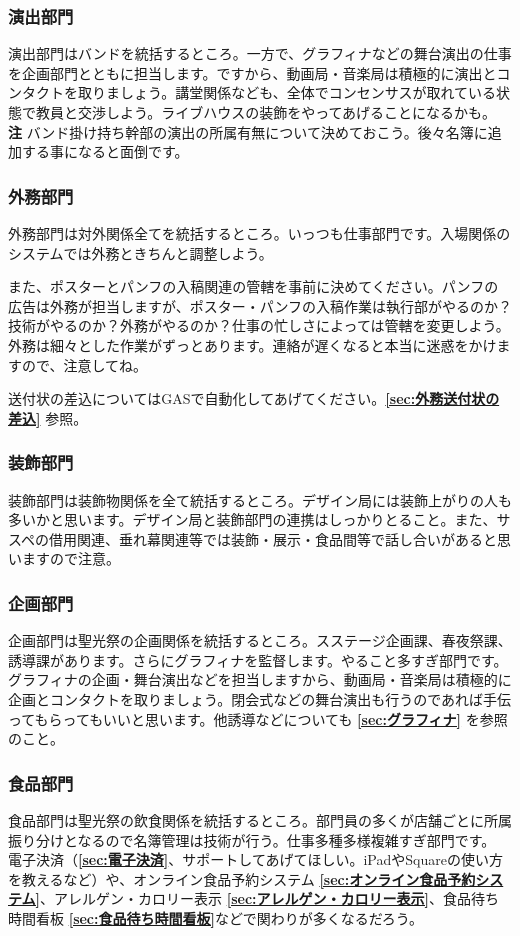 \documentclass[dvipdfmx,jb5]{jarticle}
\begin{document}
\subsubsection{演出部門}\label{sec:演出部門}
演出部門はバンドを統括するところ。一方で、グラフィナなどの舞台演出の仕事を企画部門とともに担当します。ですから、動画局・音楽局は積極的に演出とコンタクトを取りましょう。講堂関係なども、全体でコンセンサスが取れている状態で教員と交渉しよう。ライブハウスの装飾をやってあげることになるかも。\\
{\bf 注} バンド掛け持ち幹部の演出の所属有無について決めておこう。後々名簿に追加する事になると面倒です。

\subsubsection{外務部門}
外務部門は対外関係全てを統括するところ。いっつも仕事部門です。入場関係のシステムでは外務ときちんと調整しよう。

また、ポスターとパンフの入稿関連の管轄を事前に決めてください。パンフの広告は外務が担当しますが、ポスター・パンフの入稿作業は執行部がやるのか？技術がやるのか？外務がやるのか？仕事の忙しさによっては管轄を変更しよう。外務は細々とした作業がずっとあります。連絡が遅くなると本当に迷惑をかけますので、注意してね。

送付状の差込についてはGASで自動化してあげてください。{\bf \ref{sec:外務送付状の差込}} 参照。

\subsubsection{装飾部門}
装飾部門は装飾物関係を全て統括するところ。デザイン局には装飾上がりの人も多いかと思います。デザイン局と装飾部門の連携はしっかりとること。また、サスペの借用関連、垂れ幕関連等では装飾・展示・食品間等で話し合いがあると思いますので注意。

\subsubsection{企画部門}
企画部門は聖光祭の企画関係を統括するところ。スステージ企画課、春夜祭課、誘導課があります。さらにグラフィナを監督します。やること多すぎ部門です。
グラフィナの企画・舞台演出などを担当しますから、動画局・音楽局は積極的に企画とコンタクトを取りましょう。閉会式などの舞台演出も行うのであれば手伝ってもらってもいいと思います。他誘導などについても {\bf \ref{sec:グラフィナ}} を参照のこと。

\subsubsection{食品部門}
食品部門は聖光祭の飲食関係を統括するところ。部門員の多くが店舗ごとに所属振り分けとなるので名簿管理は技術が行う。仕事多種多様複雑すぎ部門です。
電子決済（{\bf \ref{sec:電子決済}}、サポートしてあげてほしい。iPadやSquareの使い方を教えるなど）や、オンライン食品予約システム {\bf \ref{sec:オンライン食品予約システム}}、アレルゲン・カロリー表示 {\bf \ref{sec:アレルゲン・カロリー表示}}、食品待ち時間看板 {\bf \ref{sec:食品待ち時間看板}}などで関わりが多くなるだろう。
\end{document}
